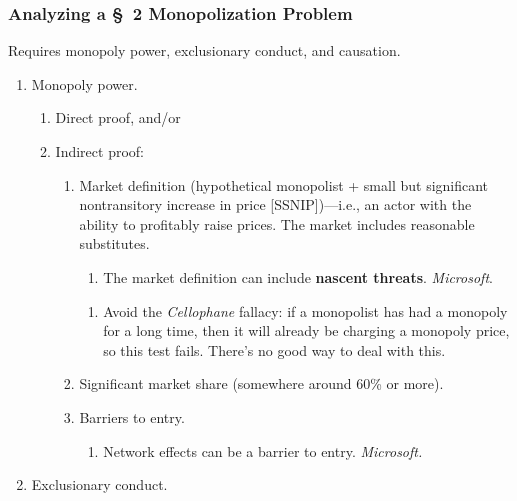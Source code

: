 \subsubsection{Analyzing a \S\ 2 Monopolization Problem}

Requires monopoly power, exclusionary conduct, and causation.

\begin{enumerate}
    \item Monopoly power.
    \begin{enumerate}
        \item Direct proof, and/or
        \item Indirect proof:
        \begin{enumerate}
            \item Market definition (hypothetical monopolist + small but 
            significant nontransitory increase in price [SSNIP])---i.e., an 
            actor with the ability to profitably raise prices. The market 
            includes reasonable substitutes.
            \begin{enumerate}
                \item The market definition can include \textbf{nascent 
                threats}. \emph{Microsoft}.
            \end{enumerate}
            \begin{enumerate}
                \item Avoid the \emph{Cellophane} fallacy: if a monopolist has 
                had a monopoly for a long time, then it will already be 
                charging a monopoly price, so this test fails. There's no good 
                way to deal with this.
            \end{enumerate}
            \item Significant market share (somewhere around 60\% or more).
            \item Barriers to entry.
            \begin{enumerate}
                \item Network effects can be a barrier to entry. 
                \emph{Microsoft.}
            \end{enumerate}
        \end{enumerate}
    \end{enumerate}
    \item Exclusionary conduct.
    \begin{enumerate}

\end{enumerate}
\end{enumerate}
